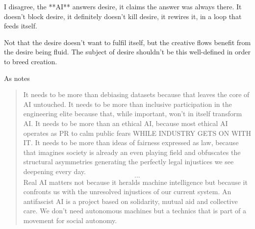 I disagree, the **AI** answers desire, it claims the answer was always there. It doesn't block desire, it definitely doesn't kill desire, it rewires it, in a loop that feeds itself.

Not that the desire doesn't want to fulfil itself, but the creative flows benefit from the desire being fluid. The subject of desire shouldn't be this well-defined in order to breed creation.




As \cite{mcquillan2019} notes
\begin{quote}
	It needs to be more than debiasing datasets because that leaves the core of AI untouched. It needs to be more than inclusive participation in the engineering elite because that, while important, won't in itself transform AI. It needs to be more than an ethical AI, because most ethical AI operates as PR to calm public fears WHILE INDUSTRY GETS ON WITH IT. It needs to be more than ideas of fairness expressed as law, because that imagines society is already an even playing field and obfuscates the structural asymmetries generating the perfectly legal injustices we see deepening every day. \cite{mcquillan2019}
	\[...\]
	Real AI matters not because it heralds machine intelligence but because it confronts us with the unresolved injustices of our current system. An antifascist AI is a project based on solidarity, mutual aid and collective care. We don't need autonomous machines but a technics that is part of a movement for social autonomy.
\end{quote}
